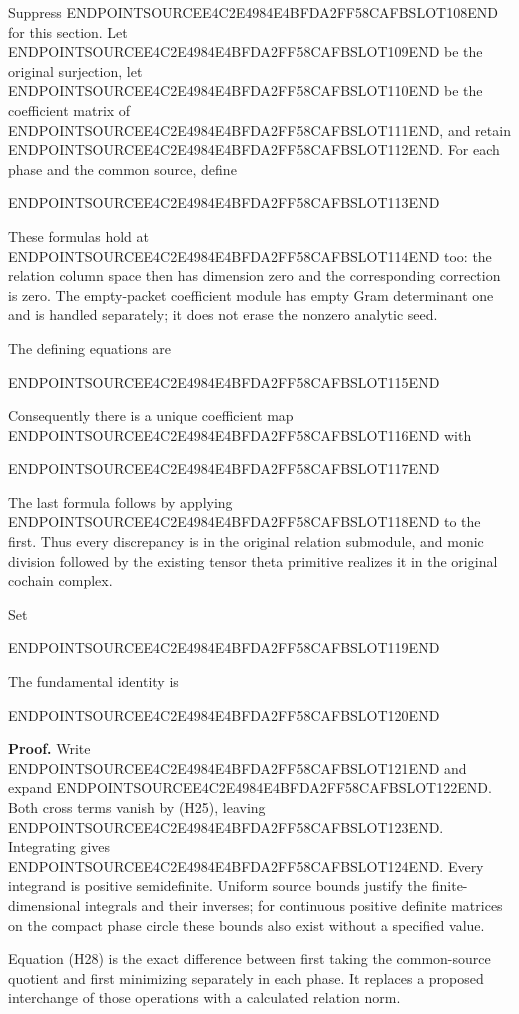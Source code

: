 Suppress ENDPOINTSOURCEE4C2E4984E4BFDA2FF58CAFBSLOT108END for this section. Let ENDPOINTSOURCEE4C2E4984E4BFDA2FF58CAFBSLOT109END be the original surjection, let ENDPOINTSOURCEE4C2E4984E4BFDA2FF58CAFBSLOT110END be the coefficient matrix of ENDPOINTSOURCEE4C2E4984E4BFDA2FF58CAFBSLOT111END, and retain ENDPOINTSOURCEE4C2E4984E4BFDA2FF58CAFBSLOT112END. For each phase and the common source, define

ENDPOINTSOURCEE4C2E4984E4BFDA2FF58CAFBSLOT113END

These formulas hold at ENDPOINTSOURCEE4C2E4984E4BFDA2FF58CAFBSLOT114END too: the relation column space then has dimension zero and the corresponding correction is zero. The empty-packet coefficient module has empty Gram determinant one and is handled separately; it does not erase the nonzero analytic seed.

The defining equations are

ENDPOINTSOURCEE4C2E4984E4BFDA2FF58CAFBSLOT115END

Consequently there is a unique coefficient map ENDPOINTSOURCEE4C2E4984E4BFDA2FF58CAFBSLOT116END with

ENDPOINTSOURCEE4C2E4984E4BFDA2FF58CAFBSLOT117END

The last formula follows by applying ENDPOINTSOURCEE4C2E4984E4BFDA2FF58CAFBSLOT118END to the first. Thus every discrepancy is in the original relation submodule, and monic division followed by the existing tensor theta primitive realizes it in the original cochain complex.

Set

ENDPOINTSOURCEE4C2E4984E4BFDA2FF58CAFBSLOT119END

The fundamental identity is

ENDPOINTSOURCEE4C2E4984E4BFDA2FF58CAFBSLOT120END

\textbf{Proof.} Write ENDPOINTSOURCEE4C2E4984E4BFDA2FF58CAFBSLOT121END and expand ENDPOINTSOURCEE4C2E4984E4BFDA2FF58CAFBSLOT122END. Both cross terms vanish by (H25), leaving ENDPOINTSOURCEE4C2E4984E4BFDA2FF58CAFBSLOT123END. Integrating gives ENDPOINTSOURCEE4C2E4984E4BFDA2FF58CAFBSLOT124END. Every integrand is positive semidefinite. Uniform source bounds justify the finite-dimensional integrals and their inverses; for continuous positive definite matrices on the compact phase circle these bounds also exist without a specified value.

Equation (H28) is the exact difference between first taking the common-source quotient and first minimizing separately in each phase. It replaces a proposed interchange of those operations with a calculated relation norm.

